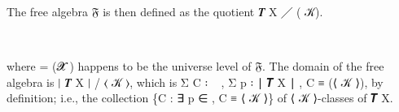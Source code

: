 \documentclass[a4paper,UKenglish,cleveref,autoref,thm-restate]{lipics-v2021}
\begin{document}
\ccpad
The free algebra \af 𝔉 is then defined as the quotient \af 𝑻 \ab X \af ╱ ( \ab 𝒦).
\ccpad
\begin{code}%
\>[1]\AgdaSpace{}%
\AgdaSymbol{:}\AgdaSpace{}%
\AgdaSpace{}%
\AgdaSpace{}%
\<%
\\
%
\>[1]\AgdaSpace{}%
\AgdaSymbol{=}%
\>[6]\AgdaSpace{}%
\AgdaSpace{}%
\AgdaSpace{}%
\AgdaSymbol{(}\AgdaSpace{}%
\AgdaSymbol{)}\<%
\end{code}
\ccpad
where  \as = (\ab 𝓧  ) happens to be the universe level of \af 𝔉. The domain of the free algebra is \af ∣ \af 𝑻 \ab X \af ∣ \af / \af ⟨  \ab 𝒦 \af ⟩, which is \ad Σ \af C \as ꞉ \AgdaUnderscore ~ , \ad Σ \ab p \as ꞉ \af ∣ \af 𝑻 \ab X \af ∣ ,  \af C \ad ≡ (\af [ \ab p \af ] \af ⟨  \ab 𝒦 \af ⟩), by definition; i.e., the collection
\{\af C \as : \as ∃ \ab p \af ∈ , \af C \af ≡ \af[ \ab p \af ] \af ⟨  \ab 𝒦 \af ⟩\} of \af ⟨  \ab 𝒦 \af ⟩-classes of \af 𝑻 \ab X.


































\end{document}
